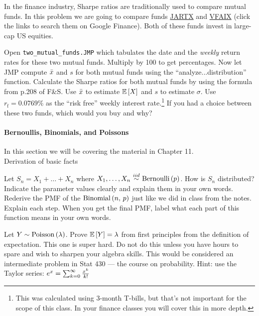 \documentclass[12pt]{article}
\begin{document}
\problem In the finance industry, Sharpe ratios are traditionally used to compare mutual funds. In this problem we are going to compare funds \href{http://www.google.com/finance?q=JARTX}{JARTX} and \href{http://www.google.com/finance?q=VFAIX}{VFAIX} (click the links to search them on Google Finance). Both of these funds invest in large-cap US equities.

 
\begin{enumerate}
\easysubproblem Open \texttt{two\_mutual\_funds.JMP} which tabulates the date and the \textit{weekly} return rates for these two mutual funds. Multiply by 100 to get percentages. Now let JMP compute $\bar{x}$ and $s$ for both mutual funds using the ``analyze...distribution'' function. Calculate the Sharpe ratios for both mutual funds by using the formula from p.208 of F\&S. Use $\bar{x}$ to estimate $\mathbb{E}\left[X\right]$ and $s$ to estimate $\sigma$. Use $r_{\text{f}}=0.0769\%$ as the ``risk free'' weekly interest rate.\footnote{This was calculated using 3-month T-bills, but that's not important for the scope of this class. In your finance classes you will cover this in more depth.}
\intermediatesubproblem If you had a choice between these two funds, which would you buy and why?
\end{enumerate}

\paragraph{Bernoullis, Binomials, and Poissons} In this section we will be covering the material in Chapter 11. \\

\problem Derivation of basic facts

\begin{enumerate}
\easysubproblem Let $S_n = X_1 + \ldots + X_n$ where $\Xoneton \iid \bernoulli{p}$. How is $S_n$ distributed? Indicate the parameter values clearly and explain them in your own words.
\intermediatesubproblem Rederive the PMF of the $\mathrm{Binomial}\left(n,\,p\right)$ just like we did in class from the notes. Explain each step. When you get the final PMF, label what each part of this function means in your own words.

\extracreditsubproblem Let $Y \sim \mathrm{Poisson}\left(\lambda\right)$. Prove $\mathbb{E}\left[Y\right] = \lambda$ from first principles \ie from the definition of expectation. This one is super hard. Do not do this unless you have hours to spare and wish to sharpen your algebra skills. This would be considered an intermediate problem in Stat 430 --- the course on probability. Hint: use the Taylor series: $e^x = \sum_{k=0}^{\infty} \frac{x^k}{k!}$ 

\end{enumerate}
\end{document}
